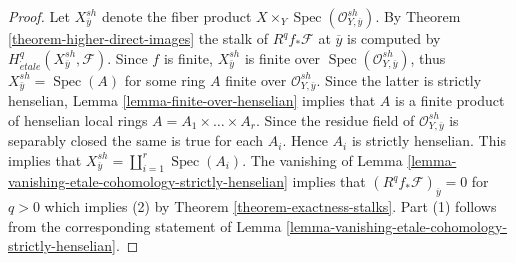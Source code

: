 \documentclass[10pt,a4paper]{amsart}
\theoremstyle{plain}
\theoremstyle{definition}
\theoremstyle{remark}
\numberwithin{equation}{subsection}
\def\Spec{\mathop{\mathrm{Spec}}}
\def\etale{{\acute{e}tale}}
\begin{document}
\begin{proof}
Let $X_{\overline{y}}^{sh}$ denote the fiber product
$X \times_Y \Spec(\mathcal{O}_{Y, \overline{y}}^{sh})$.
By Theorem \ref{theorem-higher-direct-images}
the stalk of $R^qf_*\mathcal{F}$ at $\overline{y}$ is computed by
$H_\etale^q(X_{\overline{y}}^{sh}, \mathcal{F})$.
Since $f$ is finite, $X_{\bar y}^{sh}$ is finite over
$\Spec(\mathcal{O}_{Y, \overline{y}}^{sh})$, thus
$X_{\bar y}^{sh} = \Spec(A)$ for some ring $A$
finite over $\mathcal{O}_{Y, \bar y}^{sh}$.
Since the latter is strictly henselian,
Lemma \ref{lemma-finite-over-henselian}
implies that $A$ is a finite product of henselian local rings
$A = A_1 \times \ldots \times A_r$. Since the residue field of
$\mathcal{O}_{Y, \overline{y}}^{sh}$ is separably closed the
same is true for each $A_i$. Hence $A_i$ is strictly henselian.
This implies that $X_{\overline{y}}^{sh} = \coprod_{i = 1}^r \Spec(A_i)$.
The vanishing of
Lemma \ref{lemma-vanishing-etale-cohomology-strictly-henselian}
implies that $(R^qf_*\mathcal{F})_{\overline{y}} = 0$ for $q > 0$
which implies (2) by Theorem \ref{theorem-exactness-stalks}.
Part (1) follows from the corresponding statement of
Lemma \ref{lemma-vanishing-etale-cohomology-strictly-henselian}.
\end{proof}
\end{document}

